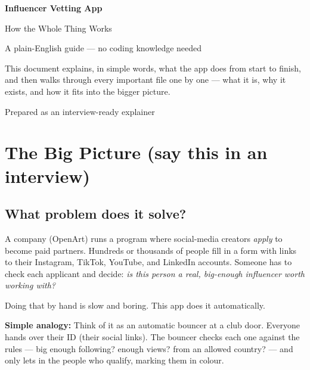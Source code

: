 \documentclass[11pt]{article}
\begin{document}
\begin{titlepage}
\centering
\vspace*{3cm}
{\Huge\bfseries\color{brandpurple} Influencer Vetting App\par}
\vspace{0.6cm}
{\LARGE\color{inkdark} How the Whole Thing Works\par}
\vspace{0.4cm}
{\large\color{inkgray} A plain-English guide — no coding knowledge needed\par}
\vspace{2cm}
\begin{plainbox}
\large
This document explains, in simple words, what the app does from start to
finish, and then walks through every important file one by one — what it is,
why it exists, and how it fits into the bigger picture.
\end{plainbox}
\vfill
{\color{inkgray}\large Prepared as an interview-ready explainer\par}
\vspace{1cm}
\end{titlepage}

\tableofcontents
\newpage

\section{The Big Picture (say this in an interview)}

\subsection{What problem does it solve?}

A company (OpenArt) runs a program where social-media creators
\emph{apply} to become paid partners. Hundreds or thousands of people fill in
a form with links to their Instagram, TikTok, YouTube, and LinkedIn accounts.
Someone has to check each applicant and decide: \emph{is this person a real,
big-enough influencer worth working with?}

Doing that by hand is slow and boring. This app does it automatically.

\begin{analogybox}
\textbf{Simple analogy:} Think of it as an automatic bouncer at a club door.
Everyone hands over their ID (their social links). The bouncer checks each one
against the rules — big enough following? enough views? from an allowed
country? — and only lets in the people who qualify, marking them in colour.
\end{analogybox}
\end{document}
